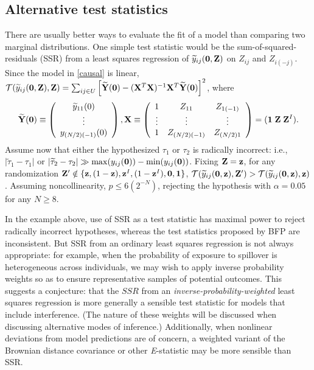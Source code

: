 \subsection*{Alternative test statistics}

There are usually better ways to evaluate the fit of a model than comparing
two marginal distributions. One simple test statistic would be the
sum-of-squared-residuals (SSR) from a least squares regression of $\widetilde
y_{ij}(\mathbf{0},\mathbf{Z})$ on $Z_{ij}$ and $Z_{i(-j)}$. Since the model in \eqref{causal}
is linear, $\mathcal{T}(\widetilde y_{ij}(\mathbf{0},\mathbf{Z}), \mathbf{Z}) = \sum_{ij \in U} \left[
  \widetilde {\mathbf{Y}}(\mathbf{0}) - (\mathbf{X}^T\mathbf{X})^{-1}\mathbf{X}^T \widetilde {\mathbf{Y}}(\mathbf{0}) \right]^2$, where $$
\widetilde {\mathbf{Y}}(\mathbf{0}) \equiv \left( \begin{array}{c} \widetilde y_{11}(0) \\
    \vdots \\ y_{(N/2)(-1)}(0) \end{array} \right), \mathbf{X} \equiv  \left(
  \begin{array}{ccc} 1 & Z_{11} & Z_{1(-1)} \\ \vdots & \vdots & \vdots  \\ 1
    & Z_{(N/2)(-1)} & Z_{(N/2)1} \end{array} \right) = ({\bf 1} \; \mathbf{Z} \;
\mathbf{Z}^I).  $$ Assume now that either the hypothesized $\tau_1$ or $\tau_2$ is
radically incorrect: i.e., $\vert \widetilde\tau_1 - \tau_1 \vert$ or $\vert
\widetilde\tau_2 - \tau_2 \vert \gg \max(y_{ij}(\mathbf{0})) - \min(y_{ij}(\mathbf{0}))$.
Fixing $\mathbf{Z} = \mathbf{z}$, for any randomization $\mathbf{Z}' \notin \{\mathbf{z}, (1-\mathbf{z}), \mathbf{z}^I,
(1-\mathbf{z}^I), \mathbf{0}, \mathbf{1} \}$, $\mathcal{T}(\widetilde y_{ij}(\mathbf{0},\mathbf{z}),\mathbf{Z}') > \mathcal{T}(\widetilde
y_{ij}(\mathbf{0},\mathbf{z}),\mathbf{z})$. Assuming noncollinearity,
$p \leq 6  \left( 2^{-N} \right)$, rejecting the hypothesis with $\alpha =
0.05$ for any $N \geq 8$. %

In the example above, use of SSR as a test statistic has maximal power to
reject radically incorrect hypotheses, whereas the test statistics proposed by
BFP are inconsistent. But SSR from an ordinary least squares regression is not
always appropriate: for example, when the probability of exposure to spillover
is heterogeneous across individuals, we may wish to apply inverse probability
weights so as to ensure representative samples of potential outcomes. This
suggests a conjecture: that the $SSR$ from an {\it
  inverse-probability-weighted} least squares regression is more generally a
sensible test statistic for models that include interference.  (The nature of
these weights will be discussed when discussing alternative modes of
inference.) Additionally, when nonlinear deviations from model predictions are
of concern, a weighted variant of the Brownian distance covariance
\cite{szekely2009brownian} or other {\it E}-statistic may be more sensible
than SSR.


